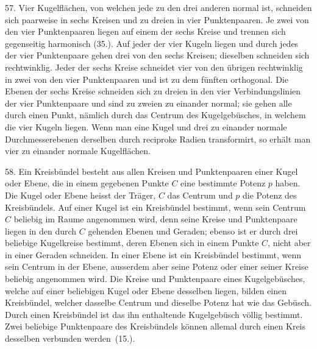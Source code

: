 57. Vier Kugelfl\"achen, von welchen jede zu den drei
anderen normal ist, schneiden sich paarweise in sechs Kreisen
und zu dreien in vier Punktenpaaren. Je zwei von den
vier Punktenpaaren liegen auf einem der sechs Kreise und
trennen sich gegenseitig harmonisch (35.). Auf jeder der
vier Kugeln liegen und durch jedes der vier Punktenpaare
gehen drei von den sechs Kreisen; dieselben schneiden sich
rechtwinklig. Jeder der sechs Kreise schneidet vier von den
\"ubrigen rechtwinklig in zwei von den vier Punktenpaaren
und ist zu dem f\"unften orthogonal. Die Ebenen der sechs
Kreise schneiden sich zu dreien in den vier Verbindungslinien
der vier Punktenpaare und sind zu zweien zu einander
normal; sie gehen alle durch einen Punkt, n\"amlich durch das
Centrum des Kugelgeb\"usches, in welchem die vier Kugeln
liegen. Wenn man eine Kugel und drei zu einander normale
Durchmesserebenen derselben durch reciproke Radien transformirt,
so erh\"alt man vier zu einander normale Kugelfl\"achen.

\begin{center}
\makebox[15em]{\hrulefill}
\end{center}

\label{p6}


\hspace{\parindent}%
58. Ein {\glqq}Kreisb\"undel{\grqq} besteht aus allen Kreisen und
Punktenpaaren einer Kugel oder Ebene, die in einem gegebenen
Punkte $C$ eine bestimmte Potenz $p$ haben. Die
Kugel oder Ebene heisst der {\glqq}Tr\"ager{\grqq}, $C$ das Centrum und
$p$ die Potenz des Kreisb\"undels. Auf einer Kugel ist ein
Kreisb\"undel bestimmt, wenn sein Centrum $C$ beliebig im
Raume angenommen wird, denn seine Kreise und Punktenpaare
liegen in den durch $C$ gehenden Ebenen und Geraden;
ebenso ist er durch drei beliebige Kugelkreise bestimmt,
deren Ebenen sich in einem Punkte $C$, nicht aber in einer
Geraden schneiden. In einer Ebene ist ein Kreisb\"undel bestimmt,
wenn sein Centrum in der Ebene, ausserdem aber
seine Potenz oder einer seiner Kreise beliebig angenommen
wird. Die Kreise und Punktenpaare eines Kugelgeb\"usches,
welche auf einer beliebigen Kugel oder Ebene desselben
liegen, bilden einen Kreisb\"undel, welcher dasselbe Centrum
und dieselbe Potenz hat wie das Geb\"usch. Durch einen
Kreisb\"undel ist das ihn enthaltende Kugelgeb\"usch v\"ollig bestimmt.
Zwei beliebige Punktenpaare des Kreisb\"undels
k\"onnen allemal durch einen Kreis desselben verbunden werden~(15.).


